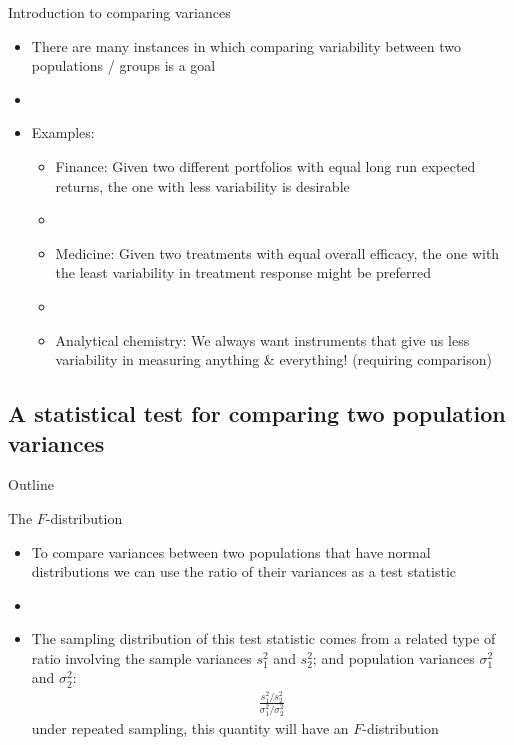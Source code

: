 \documentclass[xcolor=dvipsnames]{beamer}
\begin{document}
\begin{frame}{Introduction to comparing variances}
	\begin{itemize}
		\item There are many instances in which comparing variability between two populations / groups is a goal
	\item[]
	\item Examples:
	\begin{itemize}
		\item Finance: Given two different portfolios with equal long run expected returns, the one with less variability is desirable
		\item[]
		\item Medicine: Given two treatments with equal overall efficacy, the one with the least variability in treatment response might be preferred
		\item[]
		\item Analytical chemistry: We always want instruments that give us less variability in measuring anything \& everything! (requiring comparison)
	\end{itemize}
	\end{itemize}
\end{frame}

\subsection{A statistical test for comparing two population variances}
\begin{frame}{Outline}
	\tableofcontents[currentsection,subsectionstyle=show/shaded/hide]
\end{frame}

\begin{frame}{The $F$-distribution}
	\begin{itemize}
		\item To compare variances between two populations that have normal distributions we can use the ratio of their variances as a test statistic
		\item[]
		\item The sampling distribution of this test statistic comes from a related type of ratio involving the sample variances $s_1^2$ and $s_2^2$; and population variances $\sigma_1^2$ and $\sigma_2^2$:
		\begin{gather*}
		\frac{s_1^2 / s_2^2}{\sigma_1^2 / \sigma_2^2}
		\end{gather*}
		under repeated sampling, this quantity will have an $F$-distribution
	\end{itemize}
\end{frame}
\end{document}
